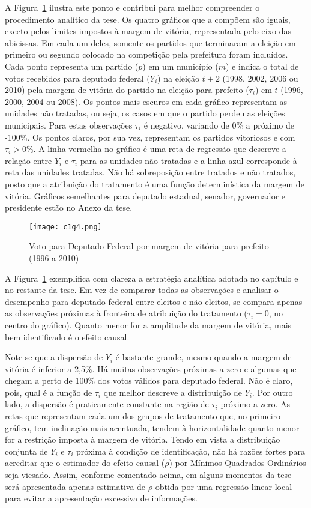 A Figura~\ref{fig:c1g4} ilustra este ponto e contribui para melhor compreender o procedimento analítico da tese. Os quatro gráficos que a compõem são iguais, exceto pelos limites impostos à margem de vitória, representada pelo eixo das abicissas. Em cada um deles, somente os partidos que terminaram a eleição em primeiro ou segundo colocado na competição pela prefeitura foram incluídos. Cada ponto representa um partido ($p$) em um município ($m$) e indica o total de votos recebidos para deputado federal ($Y_{i}$) na eleição $t+2$ (1998, 2002, 2006 ou 2010) pela margem de vitória do partido na eleição para prefeito ($\tau_{i}$) em $t$ (1996, 2000, 2004 ou 2008). Os pontos mais escuros em cada gráfico representam as unidades não tratadas, ou seja, os casos em que o partido perdeu as eleições municipais. Para estas observações $\tau_{i}$ é negativo, variando de 0\% a próximo de -100\%. Os pontos claros, por sua vez, representam os partidos vitoriosos e com $\tau_{i}>0\%$. A linha vermelha no gráfico é uma reta de regressão que descreve a relação entre $Y_{i}$ e $\tau_{i}$ para as unidades não tratadas e a linha azul corresponde à reta das unidades tratadas. Não há sobreposição entre tratados e não tratados, posto que a atribuição do tratamento é uma função determinística da margem de vitória. Gráficos semelhantes para deputado estadual, senador, governador e presidente estão no Anexo da tese.

\begin{figure}[htp]
	\centering
	\texttt{[image: c1g4.png]}
	\caption{Voto para Deputado Federal por margem de vitória para prefeito (1996 a 2010)}
	\label{fig:c1g4} 
\end{figure}

A Figura~\ref{fig:c1g4} exemplifica com clareza a estratégia analítica adotada no capítulo e no restante da tese. Em vez de comparar todas as observações e analisar o desempenho para deputado federal entre eleitos e não eleitos, se compara apenas as observações próximas à fronteira de atribuição do tratamento ($\tau_{i}=0$, no centro do gráfico). Quanto menor for a amplitude da margem de vitória, mais bem identificado é o efeito causal.

Note-se que a dispersão de $Y_{i}$ é bastante grande, mesmo quando a margem de vitória é inferior a 2,5\%. Há muitas observações próximas a zero e algumas que chegam a perto de 100\% dos votos válidos para deputado federal. Não é claro, pois, qual é a função de $\tau_{i}$ que melhor descreve a distribuição de $Y_{i}$. Por outro lado, a dispersão é praticamente constante na região de $\tau_{i}$ próximo a zero. As retas que representam cada um dos grupos de tratamento que, no primeiro gráfico, tem inclinação mais acentuada, tendem à horizontalidade quanto menor for a restrição imposta à margem de vitória. Tendo em vista a distribuição conjunta de $Y_{i}$ e $\tau_{i}$ próxima à condição de identificação, não há razões fortes para acreditar que o estimador do efeito causal ($\rho$) por Mínimos Quadrados Ordinários seja viesado. Assim, conforme comentado acima, em alguns momentos da tese será apresentada apenas estimativa de $\rho$ obtida por uma regressão linear local para evitar a apresentação excessiva de informações.

